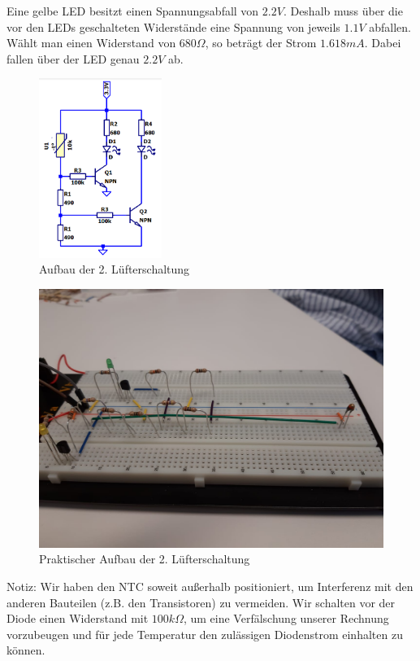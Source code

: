 \newpage

\noindent
Eine gelbe LED besitzt einen Spannungsabfall von $2.2 V$. Deshalb muss über die vor den LEDs geschalteten Widerstände eine Spannung von jeweils $1.1 V$ abfallen. Wählt man einen Widerstand von $680 \Omega$, so beträgt der Strom $1.618 mA$. Dabei fallen über der LED genau $2.2 V$ ab. \cite{diode}

\begin{figure}[htb]
    \includegraphics[width=4cm]{./res/Luefter_2_Spice}
    \caption{Aufbau der 2. Lüfterschaltung}
    \label{fig:Lüfterschaltung2}
\end{figure}

\begin{figure}[htb]
    \includegraphics[width=12cm]{./res/Luefter_2_Aufbau}
    \caption{Praktischer Aufbau der 2. Lüfterschaltung}
    \label{fig:Lüfterschaltung2Praktisch}
\end{figure}

\noindent
Notiz: Wir haben den NTC soweit außerhalb positioniert, um Interferenz mit den anderen Bauteilen (z.B. den Transistoren) zu vermeiden. Wir schalten vor der Diode einen Widerstand mit $100 k \Omega$, um eine Verfälschung unserer Rechnung vorzubeugen und für jede Temperatur den zulässigen Diodenstrom einhalten zu können.

